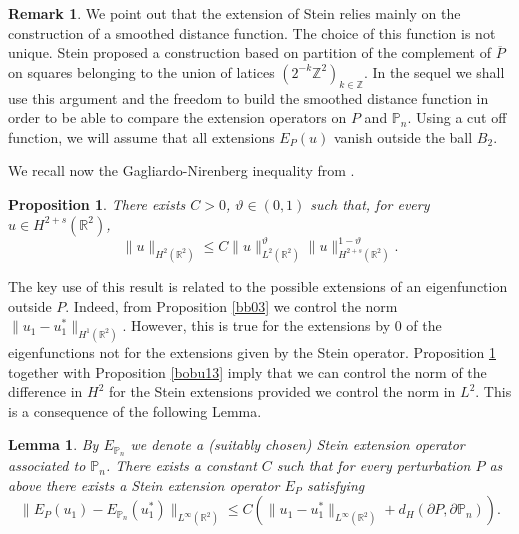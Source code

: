 \documentclass[JEP,XML,SOM,Unicode,ThmDefs,NoFloatCountersInSection,published]{cedram}
\theoremstyle{plain}
\newtheorem{lemma}[thm]{Lemma}
\newtheorem{propo}[thm]{Proposition}
\theoremstyle{definition}
\newtheorem{rem}[thm]{Remark}
\newcommand{\thetathree}{\vartheta}
\let\Bbb\mathbb
\def\R{\mathbb{R}}
\def\Z{\mathbb{Z}}
\newcommand{\ov}{\overline}
\begin{document}
\begin{rem}
We point out that the extension of Stein relies mainly on the construction of a smoothed distance function. The choice of this function is not unique. Stein proposed a construction based on partition of the complement of $\ov P$ on squares belonging to the union of latices $(2^{-k} \Z^2)_{k \in \Z}$. In the sequel we shall use this argument and the freedom to build the smoothed distance function in order to be able to compare the extension operators on $P$ and $\mathbb P_n$. Using a cut off function, we will assume that all extensions $E_P(u)$ vanish outside the ball $B_2$.
\end{rem}

We recall now the Gagliardo-Nirenberg inequality from \cite{BrMi18}.
\begin{propo}\label{bobu14}
There exists $C\!>\!0$, $\thetathree \!\in\! (0,1)$ such that, for every $u \!\in\! H^{2+s} (\R^2)$,
\[
\|u\|_{H^{2} (\R^2)}\le C \| u\|_{L^2(\R^2)}^\thetathree \|u\|_{H^{2+s} (\R^2)}^{1-\thetathree}.
\]
\end{propo}
The key use of this result is related to the possible extensions of an eigenfunction outside $P$. Indeed, from Proposition \ref{bb03} we control the norm $\|u_1-u_1^*\|_{H^1(\R^2)} $. However, this is true for the extensions by $0$ of the eigenfunctions not for the extensions given by the Stein operator. Proposition \ref{bobu14} together with Proposition \ref{bobu13} imply that we can control the norm of the difference in $H^2$ for the Stein extensions provided we control the norm in $L^2$. This is a consequence of the following Lemma.
\begin{lemma}\label{bobu15}
By $E_{\Bbb P_n}$ we denote a (suitably chosen) Stein extension operator associated to $\Bbb P_n$. There exists a constant $C$ such that for every perturbation $P$ as above there exists a Stein extension operator $E_P$ satisfying
\begin{equation}\label{bobu21}
\|E_P(u_1)-E_{\Bbb P_n}(u_1^*)\|_{L^\infty(\R^2)}\le C (\|u_1-u_1^*\|_{L^\infty(\R^2)}+ d_H(\partial P, \partial \Bbb P_n)).
\end{equation}
\end{lemma}
\end{document}
